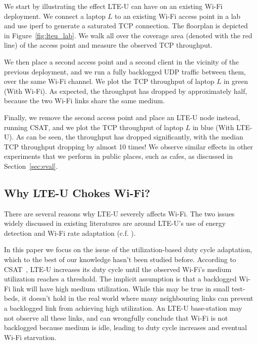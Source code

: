 We start by illustrating the effect LTE-U can have on an existing Wi-Fi deployment. We connect a laptop $L$ to an existing Wi-Fi access point in a lab and use iperf to generate a saturated TCP connection. The floorplan is depicted in Figure~\ref{fig:lteu_lab}. We walk all over the coverage area (denoted with the red line) of the access point and measure the observed TCP throughput. 

We then place a second access point and a second client in the vicinity of the previous deployment, and we run a fully backlogged UDP traffic between them, over the same Wi-Fi channel. We plot the TCP throughput of laptop $L$ in green (With Wi-Fi). As expected, the throughput has dropped by approximately half, because the two Wi-Fi links share the same medium. 

Finally, we remove the second access point and place an LTE-U node instead, running CSAT, and we plot the TCP throughput of laptop $L$ in blue (With LTE-U). As can be seen, the throughput has dropped significantly, with the median TCP throughput dropping by almost 10 times!
We observe similar effects in other experiments that we perform in public places, such as cafes, as discussed in Section~\ref{sec:eval}.



\subsection{Why LTE-U Chokes Wi-Fi?}


There are several reasons why LTE-U severely affects Wi-Fi. The two issues widely discussed in existing literatures are around LTE-U's use of energy detection and Wi-Fi rate adaptation (c.f. \cite{google, cablelabs}). 

In this paper we focus on the issue of the utilization-based duty cycle adaptation, which to the best of our knowledge hasn't been studied before. According to CSAT~\cite{lteuforum_csat}, LTE-U increases its duty cycle until the observed Wi-Fi's medium utilization reaches a threshold. The implicit assumption is that a backlogged Wi-Fi link will have high medium utilization. While this may be true in small test-beds, it doesn't hold in the real world where many neighbouring links can prevent a backlogged link from achieving high utilization. An LTE-U base-station may not observe all these links, and can wrongfully conclude that Wi-Fi is not backlogged because medium is idle, leading to duty cycle increases and eventual Wi-Fi starvation.


